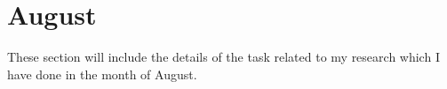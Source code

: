 \chapter{August}
\label{chap:Aug}


These section will include the details of the task related to my research which I have done in the month of August.





